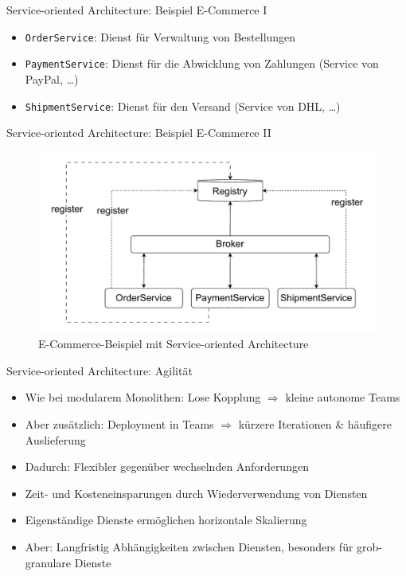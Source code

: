 \begin{frame}{Service-oriented Architecture: Beispiel E-Commerce I}
    \begin{itemize}
        \item \texttt{OrderService}: Dienst für Verwaltung von Bestellungen
        \item \texttt{PaymentService}: Dienst für die Abwicklung von Zahlungen (Service von PayPal, \ldots)
        \item \texttt{ShipmentService}: Dienst für den Versand (Service von DHL, \ldots)
    \end{itemize}
\end{frame}

\begin{frame}{Service-oriented Architecture: Beispiel E-Commerce II}
    \begin{figure}[!h]
        \centering
        \includegraphics[scale=0.50]{imglib/soa/soa-example}
        \caption{E-Commerce-Beispiel mit Service-oriented Architecture}
        \label{fig:soaecommerce}
    \end{figure}
\end{frame}

\begin{frame}{Service-oriented Architecture: Agilität}
    \begin{itemize}
        \item Wie bei modularem Monolithen: Lose Kopplung $\Rightarrow$ kleine autonome Teams
        \item Aber zusätzlich: Deployment in Teams $\Rightarrow$ kürzere Iterationen \& häufigere Auslieferung
        \item Dadurch: Flexibler gegenüber wechselnden Anforderungen
        \item Zeit- und Kosteneinsparungen durch Wiederverwendung von Diensten
        \item Eigenständige Dienste ermöglichen horizontale Skalierung
        \item Aber: Langfristig Abhängigkeiten zwischen Diensten, besonders für grob-granulare Dienste
    \end{itemize}
\end{frame}